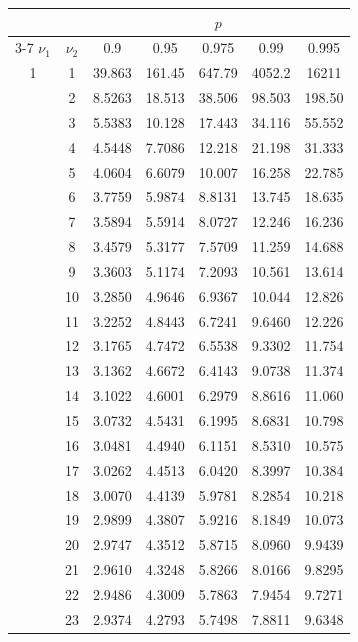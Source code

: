 \noindent
\begin{minipage}{0.49\textwidth}
	\begin{center}
		\begin{tabular}{ccccccc}
			& & \multicolumn{5}{c}{$p$}\\
			\cline{3-7}
			$\nu_1$ & $\nu_2$ & 0.9 & 0.95 & 0.975 & 0.99 & 0.995 \\
			\midrule
			1 & 1 & 39.863 & 161.45 & 647.79 & 4052.2 & 16211 \\
			& 2 & 8.5263 & 18.513 & 38.506 & 98.503 & 198.50 \\
			& 3 & 5.5383 & 10.128 & 17.443 & 34.116 & 55.552 \\
			& 4 & 4.5448 & 7.7086 & 12.218 & 21.198 & 31.333 \\
			& 5 & 4.0604 & 6.6079 & 10.007 & 16.258 & 22.785 \\
			& 6 & 3.7759 & 5.9874 & 8.8131 & 13.745 & 18.635 \\
			& 7 & 3.5894 & 5.5914 & 8.0727 & 12.246 & 16.236 \\
			& 8 & 3.4579 & 5.3177 & 7.5709 & 11.259 & 14.688 \\
			& 9 & 3.3603 & 5.1174 & 7.2093 & 10.561 & 13.614 \\[5pt]
			& 10 & 3.2850 & 4.9646 & 6.9367 & 10.044 & 12.826 \\
			& 11 & 3.2252 & 4.8443 & 6.7241 & 9.6460 & 12.226 \\
			& 12 & 3.1765 & 4.7472 & 6.5538 & 9.3302 & 11.754 \\
			& 13 & 3.1362 & 4.6672 & 6.4143 & 9.0738 & 11.374 \\
			& 14 & 3.1022 & 4.6001 & 6.2979 & 8.8616 & 11.060 \\
			& 15 & 3.0732 & 4.5431 & 6.1995 & 8.6831 & 10.798 \\
			& 16 & 3.0481 & 4.4940 & 6.1151 & 8.5310 & 10.575 \\
			& 17 & 3.0262 & 4.4513 & 6.0420 & 8.3997 & 10.384 \\
			& 18 & 3.0070 & 4.4139 & 5.9781 & 8.2854 & 10.218 \\
			& 19 & 2.9899 & 4.3807 & 5.9216 & 8.1849 & 10.073 \\[5pt]
			& 20 & 2.9747 & 4.3512 & 5.8715 & 8.0960 & 9.9439 \\
			& 21 & 2.9610 & 4.3248 & 5.8266 & 8.0166 & 9.8295 \\
			& 22 & 2.9486 & 4.3009 & 5.7863 & 7.9454 & 9.7271 \\
			& 23 & 2.9374 & 4.2793 & 5.7498 & 7.8811 & 9.6348 \\

\end{tabular}
\end{center}
\end{minipage}
